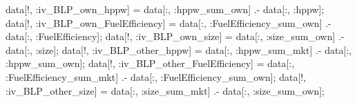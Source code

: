 \documentclass[
  letterpaper,
  DIV=11,
  numbers=noendperiod]{scrreprt}
\newenvironment{Shaded}{\begin{snugshade}}{\end{snugshade}}
\newcommand{\NormalTok}[1]{\textcolor[rgb]{0.00,0.23,0.31}{#1}}
\newcommand{\OperatorTok}[1]{\textcolor[rgb]{0.37,0.37,0.37}{#1}}
\begin{document}
\begin{Shaded}
\begin{Highlighting}[]
\NormalTok{data[!, }\OperatorTok{:}\NormalTok{iv\_BLP\_own\_hppw]             }\OperatorTok{=}\NormalTok{ data[}\OperatorTok{:}\NormalTok{, }\OperatorTok{:}\NormalTok{hppw\_sum\_own]           }\OperatorTok{.{-}}\NormalTok{ data[}\OperatorTok{:}\NormalTok{, }\OperatorTok{:}\NormalTok{hppw];}
\NormalTok{data[!, }\OperatorTok{:}\NormalTok{iv\_BLP\_own\_FuelEfficiency]   }\OperatorTok{=}\NormalTok{ data[}\OperatorTok{:}\NormalTok{, }\OperatorTok{:}\NormalTok{FuelEfficiency\_sum\_own] }\OperatorTok{.{-}}\NormalTok{ data[}\OperatorTok{:}\NormalTok{, }\OperatorTok{:}\NormalTok{FuelEfficiency];}
\NormalTok{data[!, }\OperatorTok{:}\NormalTok{iv\_BLP\_own\_size]             }\OperatorTok{=}\NormalTok{ data[}\OperatorTok{:}\NormalTok{, }\OperatorTok{:}\NormalTok{size\_sum\_own]           }\OperatorTok{.{-}}\NormalTok{ data[}\OperatorTok{:}\NormalTok{, }\OperatorTok{:}\NormalTok{size];}
\NormalTok{data[!, }\OperatorTok{:}\NormalTok{iv\_BLP\_other\_hppw]           }\OperatorTok{=}\NormalTok{ data[}\OperatorTok{:}\NormalTok{, }\OperatorTok{:}\NormalTok{hppw\_sum\_mkt]           }\OperatorTok{.{-}}\NormalTok{ data[}\OperatorTok{:}\NormalTok{, }\OperatorTok{:}\NormalTok{hppw\_sum\_own];}
\NormalTok{data[!, }\OperatorTok{:}\NormalTok{iv\_BLP\_other\_FuelEfficiency] }\OperatorTok{=}\NormalTok{ data[}\OperatorTok{:}\NormalTok{, }\OperatorTok{:}\NormalTok{FuelEfficiency\_sum\_mkt] }\OperatorTok{.{-}}\NormalTok{ data[}\OperatorTok{:}\NormalTok{, }\OperatorTok{:}\NormalTok{FuelEfficiency\_sum\_own];}
\NormalTok{data[!, }\OperatorTok{:}\NormalTok{iv\_BLP\_other\_size]           }\OperatorTok{=}\NormalTok{ data[}\OperatorTok{:}\NormalTok{, }\OperatorTok{:}\NormalTok{size\_sum\_mkt]           }\OperatorTok{.{-}}\NormalTok{ data[}\OperatorTok{:}\NormalTok{, }\OperatorTok{:}\NormalTok{size\_sum\_own];}
\end{Highlighting}
\end{Shaded}
\end{document}

